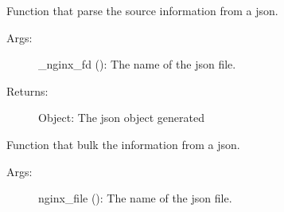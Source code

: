 \documentclass[letterpaper,10pt,english]{sphinxmanual}
\begin{document}
\begin{fulllineitems}
\label{\detokenize{elastic_bulk:elastic_bulk.decode_nginx_log}}
Function that parse the source information from a json.
\begin{description}
\item[{Args:}] \leavevmode
\_nginx\_fd (): The name of the json file.

\item[{Returns:}] \leavevmode
Object: The json object generated

\end{description}

\end{fulllineitems}


\begin{fulllineitems}
\label{\detokenize{elastic_bulk:elastic_bulk.es_add_bulk}}
Function that bulk the information from a json.
\begin{description}
\item[{Args:}] \leavevmode
nginx\_file (): The name of the json file.

\end{description}

\end{fulllineitems}



\renewcommand{\indexname}{Python Module Index}
\begin{sphinxtheindex}
\let\bigletter\sphinxstyleindexlettergroup
\bigletter{c}
\item\relax{}
\indexspace
\bigletter{e}
\item\relax{}
\indexspace
\bigletter{k}
\item\relax{}
\indexspace
\bigletter{w}
\item\relax{}
\end{sphinxtheindex}

\renewcommand{\indexname}{Index}
\printindex
\end{document}
